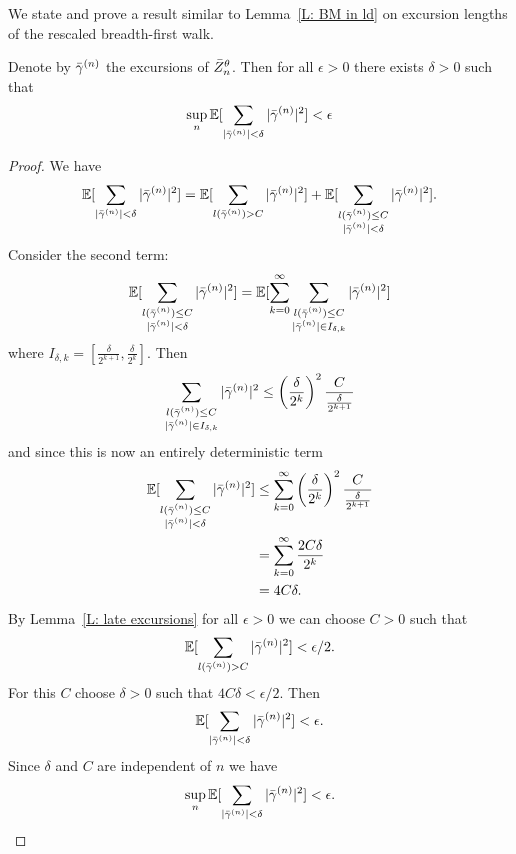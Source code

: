 We state and prove a result similar to Lemma~\ref{L: BM in ld} on excursion lengths of the rescaled breadth-first walk.
\begin{lemma} \label{L: sum rgamman}
	Denote by $\bar{\gamma}^{(n)}$ the excursions of $\bar{Z}^{\theta}_n$. 
	Then for all $\epsilon > 0$ there exists $\delta > 0$ such that
	\begin{equation}
		\sup_n \mathbb{E}[\sum_{|\bar{\gamma}^{(n)}| < \delta} |\bar{\gamma}^{(n)}|^2] < \epsilon
	\end{equation}
\end{lemma}
\begin{proof}
	We have
	\begin{equation}
		\mathbb{E}[\sum_{|\bar{\gamma}^{(n)}| < \delta} |\bar{\gamma}^{(n)}|^2] 
		= \mathbb{E}[\sum_{l(\bar{\gamma}^{(n)}) > C} |\bar{\gamma}^{(n)}|^2] 
		+ \mathbb{E}[\sum_{\substack{l(\bar{\gamma}^{(n)}) \leq C \\ |\bar{\gamma}^{(n)}| < \delta}} |\bar{\gamma}^{(n)}|^2].
	\end{equation}
	Consider the second term:
	\begin{equation}
		\mathbb{E}[\sum_{\substack{l(\bar{\gamma}^{(n)}) \leq C \\ |\bar{\gamma}^{(n)}| < \delta}} |\bar{\gamma}^{(n)}|^2]
		= \mathbb{E}[\sum_{k = 0}^{\infty} \sum_{\substack{l(\bar{\gamma}^{(n)}) \leq C \\ |\bar{\gamma}^{(n)}| \in I_{\delta, k}}} |\bar{\gamma}^{(n)}|^2]
	\end{equation}
	where $I_{\delta, k} = [ \frac{\delta}{2^{k+1}}, \frac{\delta}{2^{k}} ]$.
	Then
	\begin{equation}
		\sum_{\substack{l(\bar{\gamma}^{(n)}) \leq C \\ |\bar{\gamma}^{(n)}| \in I_{\delta, k}}} |\bar{\gamma}^{(n)}|^2 
		\leq \left(\frac{\delta}{2^k}\right)^2 \frac{C}{\frac{\delta}{2^{k+1}}}
	\end{equation}
	and since this is now an entirely deterministic term
	\begin{equation}
	\begin{aligned}
	\mathbb{E}[\sum_{\substack{l(\bar{\gamma}^{(n)}) \leq C \\ |\bar{\gamma}^{(n)}| < \delta}} |\bar{\gamma}^{(n)}|^2] 
	&\leq \sum_{k = 0}^{\infty} \left(\frac{\delta}{2^k}\right)^2 \frac{C}{\frac{\delta}{2^{k+1}}} \\
	&= \sum_{k = 0}^{\infty} \frac{2C\delta}{2^k} \\
	&= 4C\delta.
	\end{aligned}
	\end{equation}
	By Lemma~\ref{L: late excursions} for all $\epsilon > 0$ we can choose $C > 0$ such that 
	\begin{equation}
		\mathbb{E}[ \sum_{l(\bar{\gamma}^{(n)}) > C} |\bar{\gamma}^{(n)}|^2 ] < \epsilon / 2.
	\end{equation}
	For this $C$ choose $\delta > 0$ such that $4C\delta < \epsilon/2$.
	Then
	\begin{equation}
		\mathbb{E}[\sum_{|\bar{\gamma}^{(n)}| < \delta} |\bar{\gamma}^{(n)}|^2]  < \epsilon.
	\end{equation}
	Since $\delta$ and $C$ are independent of $n$ we have
	\begin{equation}
	\sup_n \mathbb{E}[\sum_{|\bar{\gamma}^{(n)}| < \delta} |\bar{\gamma}^{(n)}|^2] < \epsilon.
	\end{equation}
\end{proof}


